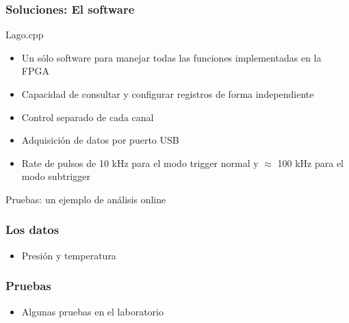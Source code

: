 \documentclass{beamer}
\begin{document}
\begin{frame}
	\frametitle{Soluciones: El software}
		\begin{block}{Lago.cpp}
    	\begin{itemize}
      	\item Un sólo software para manejar todas las 
							funciones implementadas en la FPGA
 				\item Capacidad de consultar y configurar 
							registros de forma independiente
      	\item Control separado de cada canal
      	\item Adquisición de datos por puerto USB 
      	\item Rate de pulsos de 10 kHz para el modo
							trigger normal y $\approx$ 100 kHz para el modo
							subtrigger
    	\end{itemize}
		\end{block}
\end{frame} 

\begin{frame}
\begin{block}{Pruebas: un ejemplo de análisis online}
\end{block}
\end{frame}

\begin{frame}
	\frametitle{Los datos}
  \begin{itemize}
    \item Presión y temperatura
  \end{itemize}
\end{frame} 

\begin{frame}
	\frametitle{Pruebas}
  \begin{itemize}
    \item Algunas pruebas en el laboratorio
  \end{itemize}
  \begin{center}
  \end{center}
\end{frame} 
\end{document}
